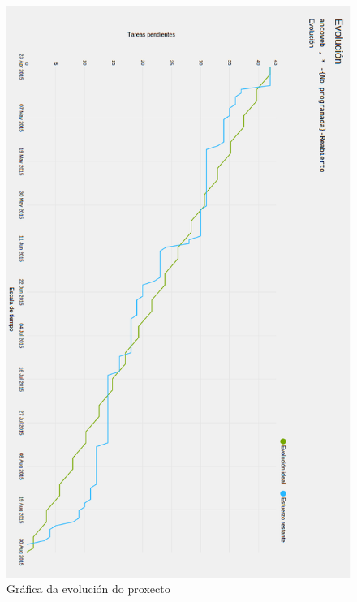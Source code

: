 \begin{figure}[htp]
\begin{center}
    \includegraphics[scale=0.6]{figures/YouTrack/evolucionProxecto.png}
    \caption{Gráfica da evolución do proxecto}
\label{fig:evolucionProxecto}
\end{center}
\end{figure}



